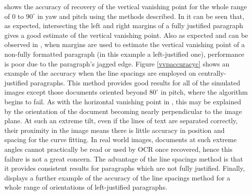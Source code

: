  shows the accuracy of recovery of the vertical vanishing
point for the whole range of $0$ to $90^\circ$ in yaw and pitch using the
methods described.  In  it can be seen that, as expected,
intersecting the left and right margins of a fully justified paragraph gives a
good estimate of the vertical vanishing point.  Also as expected and can be
observed in , when margins are used to estimate the
vertical vanishing point of a non-fully formatted paragraph (in this example a
left-justified one), performance is poor due to the paragraph's jagged edge.
Figure \ref{vvpaccuracyc} shows an example of the accuracy when the line
spacings are employed on centrally-justified paragraphs. This method provides good
results  for all of the simulated images except those
documents oriented beyond $80^\circ$ in pitch, where the algorithm begins to
fail. 
As with the horizontal vanishing point in , this may be
explained by the orientation of the document becoming nearly perpendicular to
the image plane. At such an extreme tilt, even if the lines of text are
separated correctly, their proximity in the image means there is little accuracy
in position and spacing for the curve fitting. In real world images, documents
at such extreme angles cannot practically be read or used by OCR once recovered,
hence this failure is not a great concern. The advantage of the line spacings
method is that it provides consistent results for paragraphs which are not fully
justified. Finally,  displays a further example of the
accuracy of the line spacings method for a whole range of orientations of
left-justified paragraphs.



